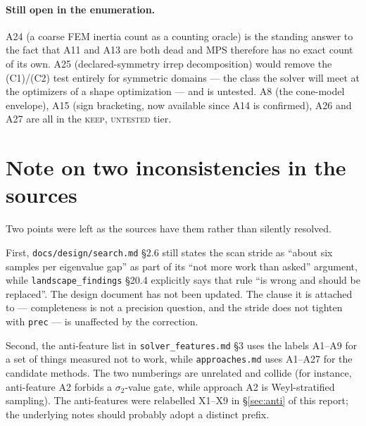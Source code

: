 \documentclass[11pt]{article}
\newcommand{\file}[1]{\texttt{#1}}
\newcommand{\sig}{\sigma}
\newcommand{\sitwo}{\sig_2}
\begin{document}
\paragraph{Still open in the enumeration.} A24 (a coarse FEM inertia count as a counting oracle) is
the standing answer to the fact that A11 and A13 are both dead and MPS therefore has no exact
count of its own. A25 (declared-symmetry irrep decomposition) would remove the (C1)/(C2) test
entirely for symmetric domains --- the class the solver will meet at the optimizers of a shape
optimization --- and is untested. A8 (the cone-model envelope), A15 (sign bracketing, now
available since A14 is confirmed), A26 and A27 are all in the \textsc{keep, untested} tier.

\section*{Note on two inconsistencies in the sources}

Two points were left as the sources have them rather than silently resolved.

First, \file{docs/design/search.md} \S2.6 still states the scan stride as ``about six samples per
eigenvalue gap'' as part of its ``not more work than asked'' argument, while
\file{landscape\_findings} \S20.4 explicitly says that rule ``is wrong and should be replaced''.
The design document has not been updated. The clause it is attached to --- completeness is not a
precision question, and the stride does not tighten with \verb|prec| --- is unaffected by the
correction.

Second, the anti-feature list in \file{solver\_features.md} \S3 uses the labels A1--A9 for a set
of things measured not to work, while \file{approaches.md} uses A1--A27 for the candidate methods.
The two numberings are unrelated and collide (for instance, anti-feature A2 forbids a
$\sitwo$-value gate, while approach A2 is Weyl-stratified sampling). The anti-features were
relabelled X1--X9 in \S\ref{sec:anti} of this report; the underlying notes should probably adopt a
distinct prefix.
\end{document}
